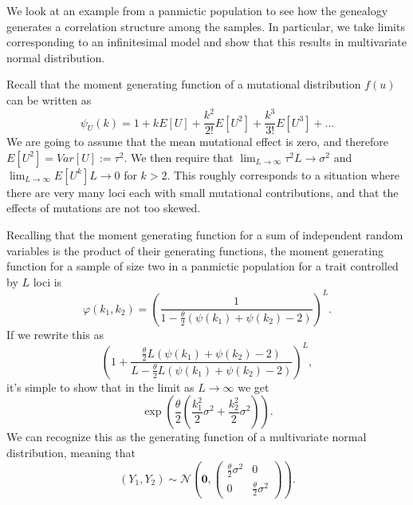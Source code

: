 We look at an example from a panmictic population to see how the genealogy generates a correlation structure among the
samples. In particular, we take limits corresponding to an infinitesimal model and show that this results in multivariate 
normal distribution. 

Recall that the moment generating function of a mutational distribution $f(u)$ can be written as 
\begin{equation*}
  \psi_{U}(k) = 1 + kE\left[ U \right] + \frac{k^2}{2!}E\left[ U^2 \right] + \frac{k^3}{3!}E\left[ U^3\right] + \ldots
\end{equation*}
We are going to assume that the mean mutational effect is zero, and therefore $E[U^2]=Var[U]:=\tau^2$. We then require
that $\lim_{L \to \infty}\tau^2L \to \sigma^2$ and $\lim_{L \to \infty}E[U^k]L \to 0$ for $k>2$. This roughly corresponds
to a situation where there are very many loci each with small mutational contributions, and that the effects of
mutations are not too skewed. 

Recalling that the moment generating function for a sum of independent random variables is the product of their
generating functions, the moment generating function for a sample of size two in a panmictic population for a trait
controlled by $L$ loci is
\begin{equation}
  \label{eq:two}
  \varphi(k_1,k_2) = \left( \frac{1}{1-\frac{\theta}{2}(\psi(k_1)+\psi(k_2)-2)}\right)^L.
\end{equation}
If we rewrite this as
\begin{equation*}
  \left( 1 + \frac{\frac{\theta}{2}L(\psi(k_1) + \psi(k_2) -2)}{L-\frac{\theta}{2}L(\psi(k_1) + \psi(k_2) -2)}\right)^L,
\end{equation*}
it's simple to show that in the limit as $L \to \infty$ we get 
\begin{equation}
  \label{eq:limexp}
  \exp\left( \frac{\theta}{2} \left( \frac{k_1^2}{2}\sigma^2 + \frac{k_2^2}{2}\sigma^2 \right)\right).
\end{equation}
We can recognize this as the generating function of a multivariate normal distribution, meaning that 
\begin{equation}
  \label{eq:twodist}
  (Y_1,Y_2) \sim \mathcal{N}\left( \mathbf{0},
    \begin{pmatrix}
      \frac{\theta}{2}\sigma^2 & 0 \\
      0 & \frac{\theta}{2}\sigma^2
    \end{pmatrix}
  \right).
\end{equation}

